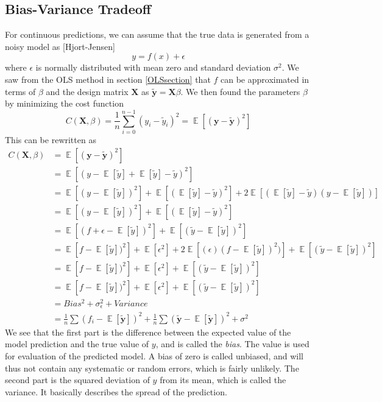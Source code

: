 \documentclass{article}
\DeclareMathOperator{\EX}{\mathbb{E}}
\begin{document}
\subsection{Bias-Variance Tradeoff}
For continuous predictions, we can assume that the true data is generated from a noisy model as [Hjort-Jensen]
\begin{equation}
y = f(x) + \epsilon
\end{equation}
where $\epsilon$ is normally distributed with mean zero and standard deviation $\sigma^{2}$. We saw from the OLS method in section \ref{OLSsection} that $f$ can be approximated in terms of $\beta$ and the design matrix $\textbf{X}$ as $\tilde{\textbf{y}} = \textbf{X} \beta$. We then found the parameters $\beta$ by minimizing the cost function
\begin{equation}\label{biastradeoff}
C(\textbf{X},\beta) = \frac{1}{n} \sum_{i=0}^{n-1} (y_{i} - \tilde{y}_{i})^{2} = \EX [(\textbf{y} - \widetilde{\textbf{y}})^{2}]
\end{equation}
This can be rewritten as
\begin{align*}\label{biastradeoff}
C(\textbf{X},\beta) &= \EX [(\textbf{y} - \widetilde{\textbf{y}})^{2}]\\
&= \EX[(y - \EX[\tilde y] + \EX[\tilde y] - \tilde y )^2]\\
	& = \EX[(y - \EX[\tilde y])^2] + \EX[(\EX[\tilde y] - \tilde y)^2] + 2 \EX[(\EX [\tilde y] - \tilde y)(y - \EX [\tilde y])]\\
	& = \EX[(y - \EX[\tilde y])^2] + \EX[(\EX[\tilde y] - \tilde y)^2]
	\\
	& = 	\EX[(f + \epsilon - \EX[\tilde y])^2] + \EX[(\tilde y - \EX[\tilde y])^2]
	\\
	& = \EX[f - \EX[\tilde y])^2] + \EX[\epsilon^2] + 2 \EX[(\epsilon) (f - \EX[\tilde y])^2)] + \EX[(\tilde y -\EX[\tilde y])^2]
	\\
	& = \EX[f - \EX[\tilde y])^2] + \EX[\epsilon^2] + \EX[(\tilde y -\EX[\tilde y])^2]
	\\
	& = \EX[f - \EX[\tilde y])^2] + \EX[\epsilon^2] + \EX[(\tilde y -\EX[\tilde y])^2]
\\
& = Bias^2 + \sigma^2_\epsilon + Variance \\
&= \frac{1}{n} \sum (f_{i} - \EX[\tilde{\textbf{y}}])^{2} + \frac{1}{n} \sum (\tilde{\textbf{y}} - \EX[\tilde{\textbf{y}}])^{2} + \sigma^{2}
\end{align*}
We see that the first part is the difference between the expected value of the model prediction and the true value of $y$, and is called the \textit{bias}. The value is used for evaluation of the predicted model. A bias of zero is called unbiased, and will thus not contain any systematic or random errors, which is fairly unlikely. The second part is the squared deviation of $y$ from its mean, which is called the {variance}. It basically describes the spread of the prediction.
\end{document}
